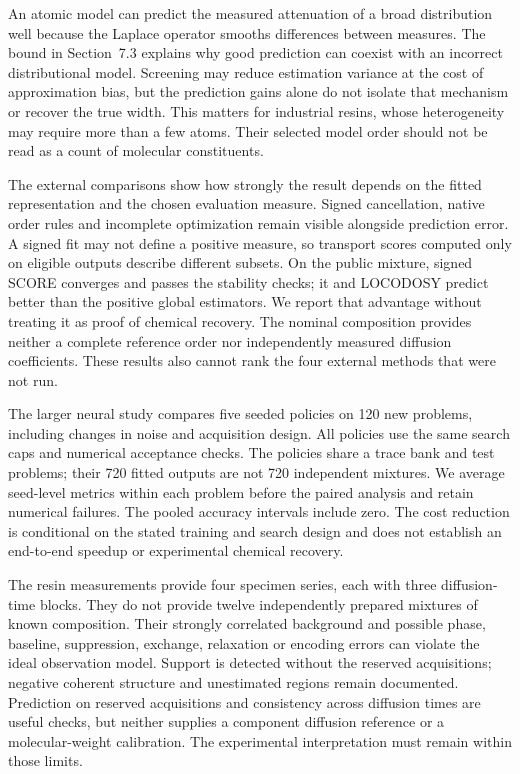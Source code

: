 An atomic model can predict the measured attenuation of a broad distribution
well because the Laplace operator smooths differences between measures.
The bound in Section~7.3 explains why good prediction can coexist with an
incorrect distributional model. Screening may reduce estimation variance at
the cost of approximation bias, but the prediction gains alone do not isolate
that mechanism or recover the true width. This matters for industrial resins,
whose heterogeneity may require more than a few atoms. Their selected model
order should not be read as a count of molecular constituents.

The external comparisons show how strongly the result depends on the fitted
representation and the chosen evaluation measure. Signed cancellation, native
order rules and incomplete optimization remain visible alongside prediction
error. A signed fit may not define a positive measure, so transport scores
computed only on eligible outputs describe different subsets. On the public
mixture, signed SCORE converges and passes the stability checks; it and LOCODOSY
predict better than the positive global estimators. We report that advantage
without treating it as proof of chemical recovery. The nominal composition
provides neither a complete reference order nor independently measured diffusion
coefficients. These results also cannot rank the four external methods that
were not run.

The larger neural study compares five seeded policies on 120 new problems,
including changes in noise and acquisition design. All policies use the same
search caps and numerical acceptance checks. The policies share a trace bank
and test problems; their 720 fitted outputs are not 720 independent mixtures.
We average seed-level metrics within each problem before the paired analysis
and retain numerical failures. The pooled accuracy intervals include zero. The cost
reduction is conditional on the stated training and search design and does
not establish an end-to-end speedup or experimental chemical recovery.

The resin measurements provide four specimen series, each with three
diffusion-time blocks. They do not provide twelve independently prepared
mixtures of known composition. Their strongly correlated background and possible
phase, baseline, suppression, exchange, relaxation or encoding errors can violate
the ideal observation model. Support is detected without the reserved acquisitions;
negative coherent structure and unestimated regions remain documented.
Prediction on reserved acquisitions and consistency across diffusion times are
useful checks, but neither supplies a component diffusion reference or a
molecular-weight calibration. The experimental interpretation must remain within
those limits.

